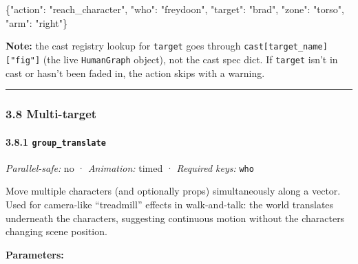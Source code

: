 \documentclass[
  12pt,
  letterpaper,
]{book}
\newenvironment{Shaded}{}{}
\newcommand{\DataTypeTok}[1]{\textcolor[rgb]{0.56,0.13,0.00}{#1}}
\newcommand{\FunctionTok}[1]{\textcolor[rgb]{0.02,0.16,0.49}{#1}}
\newcommand{\StringTok}[1]{\textcolor[rgb]{0.25,0.44,0.63}{#1}}
\begin{document}
\begin{Shaded}
\begin{Highlighting}[]
\FunctionTok{\{}\DataTypeTok{"action"}\FunctionTok{:} \StringTok{"reach\_character"}\FunctionTok{,} \DataTypeTok{"who"}\FunctionTok{:} \StringTok{"freydoon"}\FunctionTok{,} \DataTypeTok{"target"}\FunctionTok{:} \StringTok{"brad"}\FunctionTok{,}
 \DataTypeTok{"zone"}\FunctionTok{:} \StringTok{"torso"}\FunctionTok{,} \DataTypeTok{"arm"}\FunctionTok{:} \StringTok{"right"}\FunctionTok{\}}
\end{Highlighting}
\end{Shaded}

\textbf{Note:} the cast registry lookup for \texttt{target} goes through
\texttt{cast{[}target\_name{]}{[}"fig"{]}} (the live \texttt{HumanGraph}
object), not the cast spec dict. If \texttt{target} isn't in cast or
hasn't been faded in, the action skips with a warning.

\begin{center}\rule{0.5\linewidth}{0.5pt}\end{center}

\subsubsection{3.8 Multi-target}\label{multi-target}

\paragraph{\texorpdfstring{3.8.1
\texttt{group\_translate}}{3.8.1 group\_translate}}\label{group_translate}

\emph{Parallel-safe:} no · \emph{Animation:} timed · \emph{Required
keys:} \texttt{who}

Move multiple characters (and optionally props) simultaneously along a
vector. Used for camera-like ``treadmill'' effects in walk-and-talk: the
world translates underneath the characters, suggesting continuous motion
without the characters changing scene position.

\textbf{Parameters:}
\end{document}
